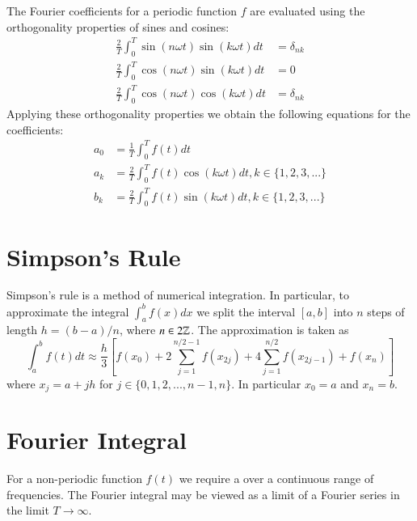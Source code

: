 \documentclass[12pt, a4paper, oneside, openright, titlepage]{book}
\begin{document}
\begin{proc}
        The Fourier coefficients for a periodic function $f$ are evaluated using the orthogonality properties of sines and cosines:\begin{align}
                \frac{2}{T}\int_0^T\sin(n\omega t)\sin(k\omega t)dt &= \delta_{nk} \\
                \frac{2}{T}\int_0^T\cos(n\omega t)\sin(k\omega t)dt &= 0 \\
                \frac{2}{T}\int_0^T\cos(n\omega t)\cos(k\omega t)dt &= \delta_{nk}
        \end{align}
        Applying these orthogonality properties we obtain the following equations for the coefficients:\begin{align}
                a_0 &= \frac{1}{T}\int_0^Tf(t)dt \\
                a_k &= \frac{2}{T}\int_0^Tf(t)\cos(k\omega t)dt, k \in \{1,2,3,...\} \\
                b_k &= \frac{2}{T}\int_0^Tf(t)\sin(k\omega t)dt, k\in \{1,2,3,...\}
        \end{align}
\end{proc}


\section{Simpson's Rule}

\begin{proc}
        Simpson's rule is a method of numerical integration. In particular, to approximate the integral $\int_a^bf(x)dx$ we split the interval $[a,b]$ into $n$ steps of length $h = (b-a)/n$, where $n \in 2\mathbb Z$. The approximation is taken as \begin{equation}
                \int_a^bf(t)dt \approx \frac{h}{3}\left[ f(x_0) + 2\sum_{j=1}^{n/2-1}f(x_{2j}) + 4\sum_{j=1}^{n/2}f(x_{2j-1}) + f(x_n)\right]
        \end{equation}
        where $x_j = a + jh$ for $j \in \{0,1,2,...,n-1, n\}$. In particular $x_0 = a$ and $x_n = b$.
\end{proc}


\section{Fourier Integral}

\begin{rmk}
        For a non-periodic function $f(t)$ we require a  over a continuous range of frequencies. The Fourier integral may be viewed as a limit of a Fourier series in the limit $T\rightarrow \infty$.
\end{rmk}
\end{document}
